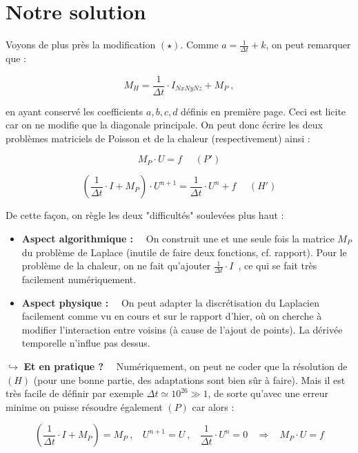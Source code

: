 \documentclass[12pt]{article}
\def \disp {\displaystyle}
\begin{document}
\vspace{10 mm}

\section{Notre solution}

\noindent
Voyons de plus près la modification $(\star)$. Comme $\disp a = \frac{1}{\Delta t} + k$, on peut remarquer que :

$$M_H = \frac{1}{\Delta t} \cdot I_{NxNyNz} + M_P~,$$

\vspace{5 mm}

\noindent
en ayant conservé les coefficients $a, b, c, d$ définis en première page. Ceci est licite car on ne modifie que la diagonale principale. On peut donc écrire les deux problèmes matriciels de Poisson et de la chaleur (respectivement) ainsi :

$$M_P \cdot U = f~~~~~~(P')$$

$$\left( \frac{1}{\Delta t} \cdot I + M_P \right) \cdot U^{n+1} = \frac{1}{\Delta t} \cdot U^n + f~~~~~~(H')$$

\vspace{5 mm}

\noindent
De cette façon, on règle les deux "difficultés" soulevées plus haut :

\vspace{5 mm}

\noindent
\begin{itemize}
	\item \textbf{Aspect algorithmique :}~~ On construit une et une seule fois la matrice $M_P$ du problème de Laplace (inutile de faire deux fonctions, cf. rapport). Pour le problème de la chaleur, on ne fait qu'ajouter $\disp \frac{1}{\Delta t} \cdot I$~, ce qui se fait très facilement numériquement.

\vspace{5 mm}

	\item \textbf{Aspect physique :}~~ On peut adapter la discrétisation du Laplacien facilement comme vu en cours et sur le rapport d'hier, où on cherche à modifier l'interaction entre voisins (à cause de l'ajout de points). La dérivée temporelle n'influe pas dessus.
\end{itemize}

\vspace{5 mm}

\noindent
$\hookrightarrow$ \textbf{Et en pratique ?}~~ Numériquement, on peut ne coder que la résolution de $(H)$ (pour une bonne partie, des adaptations sont bien sûr à faire). Mais il est très facile de définir par exemple $\Delta t \simeq 10^{26} \gg 1$, de sorte qu'avec une erreur minime on puisse résoudre également $(P)$ car alors :

$$\left( \frac{1}{\Delta t} \cdot I + M_P \right) = M_P~,~~~~ U^{n+1} = U~,~~~~ \frac{1}{\Delta t} \cdot U^n = 0~~~~\Rightarrow ~~~~M_P \cdot U = f$$
\end{document}
